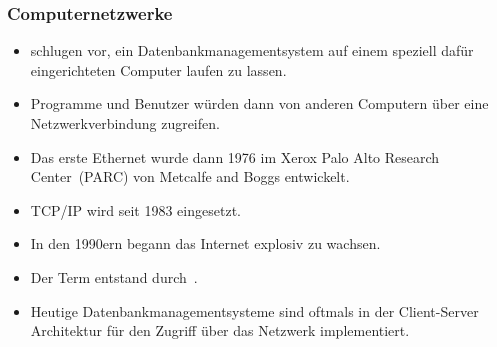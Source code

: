 \documentclass[aspectratio=169,mathserif,notheorems]{beamer}%
\begin{document}
%
\begin{frame}%
\frametitle{Computernetzwerke}%
\begin{itemize}%
\item {} schlugen \citeyear{CHIRW1974ABECFDBM} vor, ein Datenbankmanagementsystem auf einem speziell dafür eingerichteten Computer laufen zu lassen\cite{CHIRW1974ABECFDBM}.%
\item<2-> Programme und Benutzer würden dann von anderen Computern über eine Netzwerkverbindung zugreifen.%
\item<3-> Das erste Ethernet wurde dann 1976 im Xerox Palo Alto Research Center~(PARC) von Metcalfe and Boggs entwickelt\cite{CHM1996CLN}.%
\item<4-> TCP/IP wird seit 1983 eingesetzt.%
\item<5-> In den 1990ern begann das Internet explosiv zu wachsen\cite{KR2020CNATDA}.%
\item<6-> Der Term  entstand \citeyear{IMS1978SDFFIADFS} durch~\citeauthor{IMS1978SDFFIADFS}\cite{IMS1978SDFFIADFS}.%
\item<7-> Heutige Datenbankmanagementsysteme sind oftmals in der Client-Server Architektur für den Zugriff über das Netzwerk implementiert\cite{RCKS2019PNP,B1996CSA,OHE1999CSSG,RF2020FOSAAEA,EOEBEB:CSA}.%
\end{itemize}%
\end{frame}%
%
\end{document}
